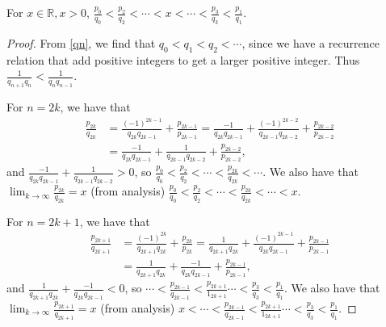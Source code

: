 \documentclass{ximera}
\begin{document}
\begin{theorem}
 For $x\in\mathbb{R},x>0$, $\frac{p_0}{q_0}<\frac{p_2}{q_2}<\cdots<x<\cdots<\frac{p_3}{q_3}<\frac{p_1}{q_1}.$
\end{theorem}
\begin{proof}
From \eqref{qn}, we find that $q_0<q_1<q_2<\cdots$, since we have a recurrence relation that add positive integers to get a larger positive integer. Thus $\frac{1}{q_{n+1}q_n}<\frac{1}{q_nq_{n-1}}$.

For $n=2k$, we have that \begin{align*}\frac{p_{2k}}{q_{2k}}&=\frac{(-1)^{2k-1}}{q_{2k}q_{2k-1}}+\frac{p_{2k-1}}{p_{2k-1}}=\frac{-1}{q_{2k}q_{2k-1}}+\frac{(-1)^{2k-2}}{q_{2k-1}q_{2k-2}}+\frac{p_{2k-2}}{p_{2k-2}}\\
&=\frac{-1}{q_{2k}q_{2k-1}}+\frac{1}{q_{2k-1}q_{2k-2}}+\frac{p_{2k-2}}{p_{2k-2}},\end{align*}
and $\frac{-1}{q_{2k}q_{2k-1}}+\frac{1}{q_{2k-1}q_{2k-2}}>0$, so $\frac{p_0}{q_0}<\frac{p_2}{q_2}<\cdots<\frac{p_{2k}}{q_{2k}}<\cdots$. We also have that $\lim_{k\to\infty}\frac{p_{2k}}{q_{2k}}=x$ (from analysis) $\frac{p_0}{q_0}<\frac{p_2}{q_2}<\cdots<\frac{p_{2k}}{q_{2k}}<\cdots<x.$

For $n=2k+1$, we have that \begin{align*}\frac{p_{2k+1}}{q_{2k+1}}&=\frac{(-1)^{2k}}{q_{2k+1}q_{2k}}+\frac{p_{2k}}{p_{2k}}=\frac{1}{q_{2k+1}q_{2k}}+\frac{(-1)^{2k-1}}{q_{2k}q_{2k-1}}+\frac{p_{2k-1}}{p_{2k-1}}\\
&=\frac{1}{q_{2k+1}q_{2k}}+\frac{-1}{q_{2k}q_{2k-1}}+\frac{p_{2k-1}}{p_{2k-1}},\end{align*}
and $\frac{1}{q_{2k+1}q_{2k}}+\frac{-1}{q_{2k}q_{2k-1}}<0$, so $\cdots<\frac{p_{2k-1}}{q_{2k-1}}<\frac{p_{2k+1}}{1_{2k+1}}\cdots<\frac{p_{3}}{q_{3}}<\frac{p_1}{q_1}$. We also have that $\lim_{k\to\infty}\frac{p_{2k+1}}{q_{2k+1}}=x$ (from analysis) $x<\cdots<\frac{p_{2k-1}}{q_{2k-1}}<\frac{p_{2k+1}}{1_{2k+1}}\cdots<\frac{p_{3}}{q_{3}}<\frac{p_1}{q_1}.$
\end{proof}
\end{document}
